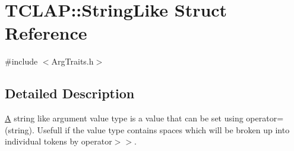 \hypertarget{struct_t_c_l_a_p_1_1_string_like}{\section{T\+C\+L\+A\+P\+:\+:String\+Like Struct Reference}
\label{struct_t_c_l_a_p_1_1_string_like}
}


{\ttfamily \#include $<$Arg\+Traits.\+h$>$}



\subsection{Detailed Description}
\hyperlink{class_a}{A} string like argument value type is a value that can be set using operator=(string). Usefull if the value type contains spaces which will be broken up into individual tokens by operator$>$$>$. 
